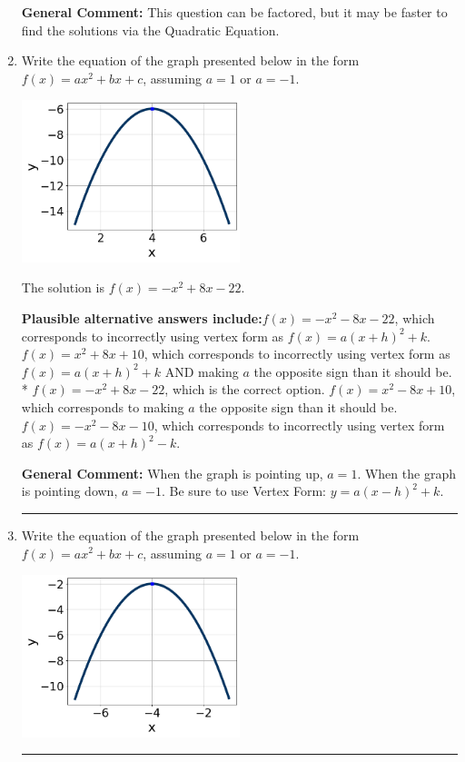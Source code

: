 \documentclass{extbook}[14pt]
\newcommand{\litem}[1]{\item #1

\rule{\textwidth}{0.4pt}}
\begin{document}
\begin{enumerate}
{\textbf{General Comment:} This question can be factored, but it may be faster to find the solutions via the Quadratic Equation.
}
\litem{
Write the equation of the graph presented below in the form $f(x)=ax^2+bx+c$, assuming  $a=1$ or $a=-1$.

\begin{center}
    \includegraphics[width=0.5\textwidth]{../Figures/quadraticGraphToEquationCopyB.png}
\end{center}


The solution is \( f(x) = -x^{2} +8 x -22 \).\begin{enumerate}[label=\Alph*.]
\textbf{Plausible alternative answers include:}$f(x)=-x^{2} -8 x -22$, which corresponds to incorrectly using vertex form as $f(x) = a(x+h)^2+k$.
$f(x)=x^{2} +8 x + 10$, which corresponds to incorrectly using vertex form as $f(x) = a(x+h)^2+k$ AND making $a$ the opposite sign than it should be.
* $f(x)=-x^{2} +8 x -22$, which is the correct option.
$f(x)=x^{2} -8 x + 10$, which corresponds to making $a$ the opposite sign than it should be.
$f(x)=-x^{2} -8 x -10$, which corresponds to incorrectly using vertex form as $f(x) = a(x+h)^2 - k$.
\end{enumerate}

\textbf{General Comment:} When the graph is pointing up, $a=1$. When the graph is pointing down, $a=-1$. Be sure to use Vertex Form: $y = a(x-h)^2+k$.
}
\litem{
Write the equation of the graph presented below in the form $f(x)=ax^2+bx+c$, assuming  $a=1$ or $a=-1$.

\begin{center}
    \includegraphics[width=0.5\textwidth]{../Figures/quadraticGraphToEquationB.png}
\end{center}


}
\end{enumerate}
\end{document}
